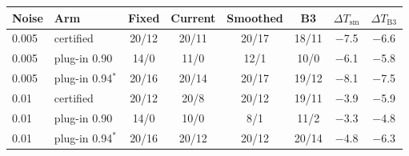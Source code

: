 \begin{tabular}{llcccccc}
\toprule
Noise & Arm & Fixed & Current & Smoothed & B3 & $\Delta T_{\mathrm{sm}}$ & $\Delta T_{\mathrm{B3}}$ \\
\midrule
0.005 & certified & 20/12 & 20/11 & 20/17 & 18/11 & $-$7.5 & $-$6.6 \\
0.005 & plug-in 0.90 & 14/0 & 11/0 & 12/1 & 10/0 & $-$6.1 & $-$5.8 \\
0.005 & plug-in 0.94$^*$ & 20/16 & 20/14 & 20/17 & 19/12 & $-$8.1 & $-$7.5 \\
0.01 & certified & 20/12 & 20/8 & 20/12 & 19/11 & $-$3.9 & $-$5.9 \\
0.01 & plug-in 0.90 & 14/0 & 10/0 & 8/1 & 11/2 & $-$3.3 & $-$4.8 \\
0.01 & plug-in 0.94$^*$ & 20/16 & 20/12 & 20/12 & 20/14 & $-$4.8 & $-$6.3 \\
\bottomrule
\end{tabular}
